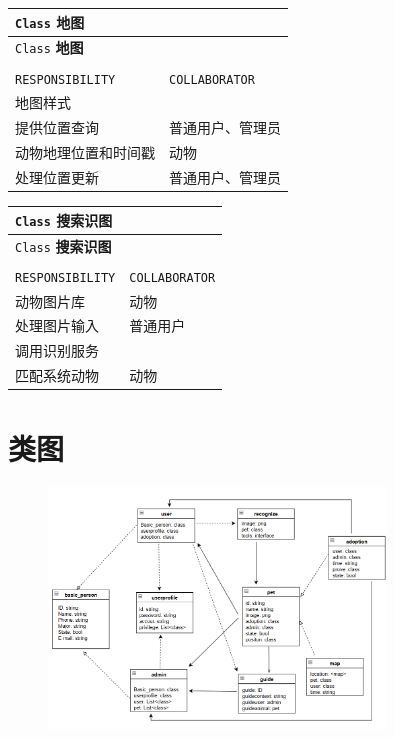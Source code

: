 \documentclass[12pt,a4paper,UTF8]{article}
\begin{document}
\vspace{0.8cm}

\begin{xltabular}{\linewidth}{|>{\raggedright\arraybackslash}p{8cm}|>{\raggedright\arraybackslash}p{4cm}|}
  \hline
  \verb|Class| \textbf{地图} &  \\ \hline \endfirsthead
  \hline
  \verb|Class| \textbf{地图} &  \\ \hline \endhead
  \hline
   \\ \endfoot
  \hline \endlastfoot

  \verb|RESPONSIBILITY| & \verb|COLLABORATOR| \\ \hline
  地图样式 &  \\ \hline
  提供位置查询 & 普通用户、管理员 \\ \hline
  动物地理位置和时间戳 & 动物 \\ \hline
  处理位置更新 &  普通用户、管理员 \\ \hline
\end{xltabular}

\vspace{1cm}

\begin{xltabular}{\linewidth}{|>{\raggedright\arraybackslash}p{8cm}|>{\raggedright\arraybackslash}p{4cm}|}
  \hline
  \verb|Class| \textbf{搜索识图} &  \\ \hline \endfirsthead
  \hline
  \verb|Class| \textbf{搜索识图} &  \\ \hline \endhead
  \hline
   \\ \endfoot
  \hline \endlastfoot

  \verb|RESPONSIBILITY| & \verb|COLLABORATOR| \\ \hline
  动物图片库 & 动物 \\ \hline
  处理图片输入 & 普通用户 \\ \hline
  调用识别服务 &  \\ \hline
  匹配系统动物 & 动物 \\ \hline
\end{xltabular}

\section{类图}

\begin{figure}[H]
  \centering
  \includegraphics[width=0.8\textwidth]{figures/class.png}
\end{figure}
\end{document}

